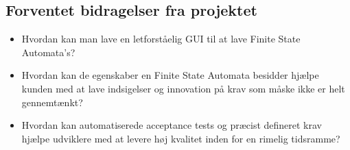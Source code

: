 \subsection{Forventet bidragelser fra projektet}
\begin{itemize}
    \item Hvordan kan man lave en letforståelig GUI til at lave Finite State Automata's?
    \item Hvordan kan de egenskaber en Finite State Automata besidder hjælpe kunden med at lave indsigelser og innovation på krav som måske ikke er helt gennemtænkt?
    \item Hvordan kan automatiserede acceptance tests og præcist defineret krav hjælpe udviklere med at levere høj kvalitet inden for en rimelig tidsramme?
\end{itemize}
